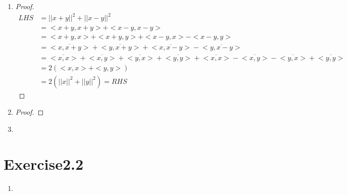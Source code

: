 \documentclass[paper=a4, fontsize=11pt]{scrartcl} %
\numberwithin{equation}{section} %
\numberwithin{figure}{section} %
\numberwithin{table}{section} %
\begin{document}
\begin{enumerate}
\begin{proof}
\begin{equation}
\begin{aligned}
						= & \frac{i}{2} (<x, iy> + <iy, x>)\\
						= & \frac{i}{2} (i<x, y> + \overline{i}<y, x>)\\
						= & \frac{1}{2} (-<x, y> + <y,x>)
					\end{aligned}
				\end{equation}
				Thus
				\begin{equation}
					\begin{aligned}
						RHS & = \frac{1}{4} (||x+y||^2  - ||x-y||^2) - \frac{i}{4} (||x+iy||^2  - ||x-iy||^2)\\
						    & = \frac{1}{2}(<x, y> + <y, x>) - \frac{1}{2} (-<x, y> + <y,x>)\\
						    & = <x, y> = LHS
					\end{aligned}
				\end{equation}
			\end{proof}
		\item 
			\begin{proof}
				\begin{equation}
					\begin{aligned}
						LHS & = ||x+y||^2 + ||x-y||^2\\
						    & = <x+y, x+y> + <x-y, x-y>\\
						    & = <x+y, x> + <x+y, y> + <x-y, x> - <x-y, y>\\
						    & = \overline{<x, x+y>} + \overline{<y, x+y>} + \overline{<x, x-y>} - \overline{<y, x-y>}\\
						    & = \overline{<x, x>} + \overline{<x, y>} + \overline{<y, x>} + \overline{<y, y>} + \overline{<x, x>} - \overline{<x, y>} - \overline{<y, x>} + \overline{<y, y>}\\
						    & = 2(<x, x>+<y, y>)\\
						    & = 2(||x||^2 + ||y||^2) = RHS
					\end{aligned}
				\end{equation}
			\end{proof}	
		\item 
			\begin{proof}
				
			\end{proof}
		
		\item 
		
	\end{enumerate}

\section{Exercise2.2}
	\begin{enumerate}
		\item
	
	\end{enumerate}
\end{document}
